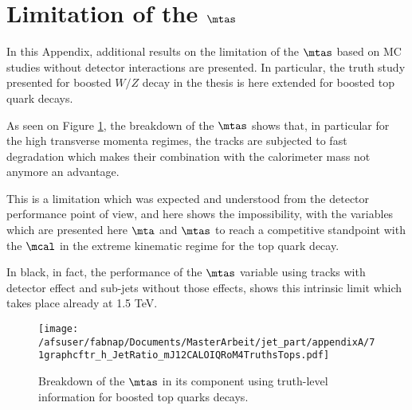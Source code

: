 \section{Limitation of the $\mtas$}

In this Appendix, additional results on the limitation of the $\mtas$ based on MC studies without detector interactions are presented. In particular, the truth study presented for boosted $W/Z$ decay in the thesis is here extended for boosted top quark decays.

As seen on Figure \ref{fig:breakdown3}, the breakdown of the $\mtas$ shows that, in particular for the high transverse momenta regimes, the tracks are subjected to fast degradation which makes their combination with the calorimeter mass not anymore an advantage. 

This is a limitation which was expected and understood from the detector performance point of view, and here shows the impossibility, with the variables which are presented here $\mta$ and $\mtas$ to reach a competitive standpoint with the $\mcal$ in the extreme kinematic regime for the top quark decay.

In black, in fact, the performance of the $\mtas$ variable using tracks with detector effect and sub-jets without those effects, shows this intrinsic limit which takes place already at 1.5 TeV.

\begin{figure}[!ht]
  \centering
      \texttt{[image: /afsuser/fabnap/Documents/MasterArbeit/jet\_part/appendixA/71graphcftr\_h\_JetRatio\_mJ12CALOIQRoM4TruthsTops.pdf]}
  \caption[Breakdown of the $\mtas$ ]{Breakdown of the $\mtas$ in its component using truth-level information for boosted top quarks decays.}
  \label{fig:breakdown3}
\end{figure}
